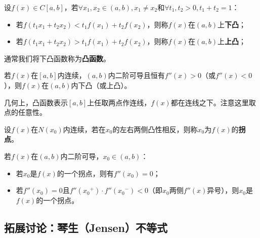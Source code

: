 \begin{definition}[凸函数]
设$f\left( x \right) \in C\left[ a,b \right] $，若$\forall x_1,x_2\in \left( a,b \right) ,x_1\ne x_2$和$\forall t_1,t_2>0,t_1+t_2=1$：
\begin{itemize}
    \item 若$f\left( t_1x_1+t_2x_2 \right) <t_1f\left( x_1 \right) +t_2f\left( x_2 \right) $，则称$f\left( x \right) $在$\left( a,b \right) $上{\bf 下凸}；
    \item 若$f\left( t_1x_1+t_2x_2 \right) >t_1f\left( x_1 \right) +t_2f\left( x_2 \right) $，则称$f\left( x \right) $在$\left( a,b \right) $上{\bf 上凸}；
\end{itemize}
通常我们将下凸函数称为{\bf 凸函数}。
\end{definition}

\begin{theorem}
若$f\left( x \right) $在$\left[ a,b \right] $内连续，$\left( a,b \right) $内二阶可导且恒有$f''\left( x \right) >0$（或$f''\left( x \right) <0$），则$f\left( x \right) $在$\left( a,b \right) $内下凸（或上凸）。
\end{theorem}

几何上，凸函数表示$\left[ a,b \right] $上任取两点作连线，$f\left( x \right) $都在连线之下。注意这里取点的任意性。

\begin{definition}[拐点]
设$f\left( x \right) $在$N\left( x_0 \right) $内连续，若在$x_0$的左右两侧凸性相反，则称$x_0$为$f\left( x \right) $的{\bf 拐点}。
\end{definition}

\begin{theorem}
若$f\left( x \right) $在$\left( a,b \right) $内二阶可导，$x_0\in \left( a,b \right) $：
\begin{itemize}
    \item 若$x_0$是$f\left( x \right) $的一个拐点，则有$f''\left( x_0 \right) =0$；
    \item 若$f''\left( x_0 \right) =0$且$f''\left( {x_0}^+ \right) \cdot f''\left( {x_0}^- \right) <0$（即$x_0$两侧$f''\left( x \right) $异号），则$x_0$是$f\left( x \right) $的一个拐点。
\end{itemize}
\end{theorem}

\subsection{拓展讨论：琴生（Jensen）不等式}

